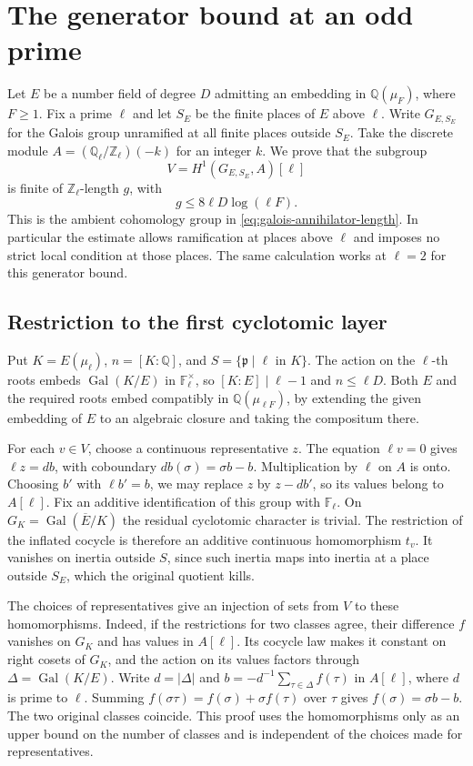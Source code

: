 \section{The generator bound at an odd prime}
\label{sec:selmer-generators}

Let \(E\) be a number field of degree \(D\) admitting an embedding in
\(\mathbb Q(\mu_F)\), where \(F\ge1\). Fix a prime \(\ell\) and let
\(S_E\) be the finite places of \(E\) above \(\ell\). Write
\(G_{E,S_E}\) for the Galois group unramified at all finite places
outside \(S_E\). Take the discrete module
\(A=(\mathbb Q_\ell/\mathbb Z_\ell)(-k)\) for an integer \(k\).
We prove that the subgroup
\[
        V=H^1(G_{E,S_E},A)[\ell]
\]
is finite of \(\mathbb Z_\ell\)-length \(g\), with
\[
              g\le 8\ell D\log(\ell F).
\]
This is the ambient cohomology group in
\eqref{eq:galois-annihilator-length}. In particular the estimate
allows ramification at places above \(\ell\) and imposes no strict
local condition at those places. The same calculation works at
\(\ell=2\) for this generator bound.

\subsection{Restriction to the first cyclotomic layer}

Put \(K=E(\mu_\ell)\), \(n=[K:\mathbb Q]\), and
\(S=\{\mathfrak p\mid\ell\text{ in }K\}\). The action on the
\(\ell\)-th roots embeds \(\operatorname{Gal}(K/E)\) in
\(\mathbb F_\ell^\times\), so \([K:E]\mid\ell-1\) and
\(n\le\ell D\). Both \(E\) and the required roots embed compatibly
in \(\mathbb Q(\mu_{\ell F})\), by extending the given embedding of
\(E\) to an algebraic closure and taking the compositum there.

For each \(v\in V\), choose a continuous representative \(z\).
The equation \(\ell v=0\) gives \(\ell z=db\), with coboundary
\(db(\sigma)=\sigma b-b\). Multiplication by \(\ell\) on \(A\)
is onto. Choosing \(b'\) with \(\ell b'=b\), we may replace \(z\)
by \(z-db'\), so its values belong to \(A[\ell]\).
Fix an additive identification of this group with \(\mathbb F_\ell\).
On \(G_K=\operatorname{Gal}(\overline E/K)\) the residual
cyclotomic character is trivial. The restriction of the inflated
cocycle is therefore an additive continuous homomorphism \(t_v\).
It vanishes on inertia outside \(S\), since such inertia maps into inertia
at a place outside \(S_E\), which the original quotient kills.

The choices of representatives give an injection of sets from \(V\)
to these homomorphisms. Indeed, if the restrictions for two classes
agree, their difference \(f\) vanishes on \(G_K\) and has values in
\(A[\ell]\). Its cocycle law makes it constant on right cosets of
\(G_K\), and the action on its values factors through
\(\Delta=\operatorname{Gal}(K/E)\). Write \(d=|\Delta|\) and
\(b=-d^{-1}\sum_{\tau\in\Delta} f(\tau)\) in \(A[\ell]\), where
\(d\) is prime to \(\ell\). Summing
\(f(\sigma\tau)=f(\sigma)+\sigma f(\tau)\) over \(\tau\) gives
\(f(\sigma)=\sigma b-b\). The two original classes coincide.
This proof uses the homomorphisms only as an upper bound on the
number of classes and is independent of the choices made for
representatives.

